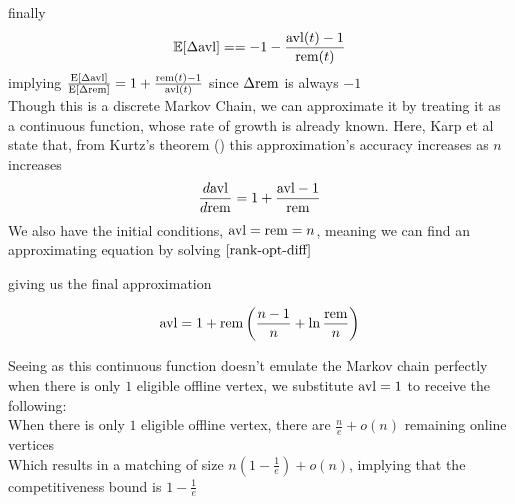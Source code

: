 finally
\begin{equation}
	\label{rank-opt-e-avl}
	\mathbb{E}[\Delta\mathrm{avl}]==-1-\frac{\mathrm{avl}(t)-1}{\mathrm{rem}(t)}
\end{equation}
implying $\frac{\mathrm{E}[\Delta\mathrm{avl}]}{\mathrm{E}[\mathrm{\Delta\mathrm{rem}}]}=1+\frac{\mathrm{rem}(t)-1}{\mathrm{avl}(t)}$ since $\Delta\mathrm{rem}$ is always $-1$\\
Though this is a discrete Markov Chain, we can approximate it by treating it as a continuous function, whose rate of growth is already known. Here, Karp et al state that, from Kurtz's theorem (\cite{kurtz}) this approximation's accuracy increases as $n$ increases
\begin{equation}
	\label{rank-opt-diff}
	\frac{d\mathrm{avl}}{d\mathrm{rem}}=1+\frac{\mathrm{avl}-1}{\mathrm{rem}}
\end{equation}
We also have the initial conditions, $\mathrm{avl}=\mathrm{rem}=n$, meaning we can find an approximating equation by solving $\autoref{rank-opt-diff}$

giving us the final approximation

\begin{equation}
	\label{rank-opt-final}
	\mathrm{avl}=1+\mathrm{rem}\left(\frac{n-1}{n}+\ln\frac{\mathrm{rem}}{n}\right)
\end{equation}

Seeing as this continuous function doesn't emulate the Markov chain perfectly when there is only $1$ eligible offline vertex, we substitute $\mathrm{avl}=1$ to receive the following:\\
When there is only $1$ eligible offline vertex, there are $\frac{n}{e}+o(n)$ remaining online vertices\\
Which results in a matching of size $n(1-\frac{1}{e})+o(n)$, implying that the competitiveness bound is $1-\frac{1}{e}$
